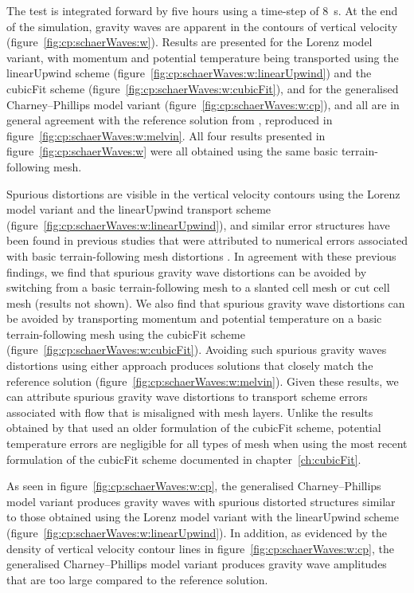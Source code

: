The test is integrated forward by five hours using a time-step of \SI{8}{\second}.  At the end of the simulation, gravity waves are apparent in the contours of vertical velocity (figure~\ref{fig:cp:schaerWaves:w}).
Results are presented for the Lorenz model variant, with momentum and potential temperature being transported using the linearUpwind scheme (figure~\ref{fig:cp:schaerWaves:w:linearUpwind}) and the cubicFit scheme (figure~\ref{fig:cp:schaerWaves:w:cubicFit}), and for the generalised Charney--Phillips model variant (figure~\ref{fig:cp:schaerWaves:w:cp}), and all are in general agreement with the reference solution from \citet{melvin2010}, reproduced in figure~\ref{fig:cp:schaerWaves:w:melvin}.
All four results presented in figure~\ref{fig:cp:schaerWaves:w} were all obtained using the same basic terrain-following mesh.

Spurious distortions are visible in the vertical velocity contours using the Lorenz model variant and the linearUpwind transport scheme (figure~\ref{fig:cp:schaerWaves:w:linearUpwind}), and similar error structures have been found in previous studies that were attributed to numerical errors associated with basic terrain-following mesh distortions \citep{schaer2002,klemp2003}.
In agreement with these previous findings, we find that spurious gravity wave distortions can be avoided by switching from a basic terrain-following mesh to a slanted cell mesh or cut cell mesh (results not shown).
We also find that spurious gravity wave distortions can be avoided by transporting momentum and potential temperature on a basic terrain-following mesh using the cubicFit scheme (figure~\ref{fig:cp:schaerWaves:w:cubicFit}).
Avoiding such spurious gravity waves distortions using either approach produces solutions that closely match the reference solution (figure~\ref{fig:cp:schaerWaves:w:melvin}).
Given these results, we can attribute spurious gravity wave distortions to transport scheme errors associated with flow that is misaligned with mesh layers.
Unlike the results obtained by \citet{shaw-weller2016} that used an older formulation of the cubicFit scheme, potential temperature errors are negligible for all types of mesh when using the most recent formulation of the cubicFit scheme documented in chapter~\ref{ch:cubicFit}.

As seen in figure~\ref{fig:cp:schaerWaves:w:cp}, the generalised Charney--Phillips model variant produces gravity waves with spurious distorted structures similar to those obtained using the Lorenz model variant with the linearUpwind scheme (figure~\ref{fig:cp:schaerWaves:w:linearUpwind}).
In addition, as evidenced by the density of vertical velocity contour lines in figure~\ref{fig:cp:schaerWaves:w:cp}, the generalised Charney--Phillips model variant produces gravity wave amplitudes that are too large compared to the reference solution.

